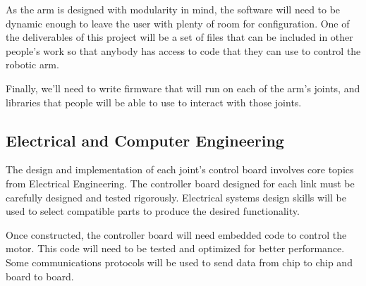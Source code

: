 \noindent As the arm is designed with modularity in mind, the software will need to be dynamic enough to leave the user with plenty of room for configuration. One of the deliverables of this project will be a set of files that can be included in other people's work so that anybody has access to code that they can use to control the robotic arm.

\noindent Finally, we'll need to write firmware that will run on each of the arm's joints, and libraries that people will be able to use to interact with those joints. 
\subsection{Electrical and Computer Engineering}
The design and implementation of each joint's control board involves core topics from Electrical Engineering. The controller board designed for each link must be carefully designed and tested rigorously. Electrical systems design skills will be used to select compatible parts to produce the desired functionality. 

\noindent Once constructed, the controller board will need embedded code to control the motor. This code will need to be tested and optimized for better performance. Some communications protocols will be used to send data from chip to chip and board to board.



